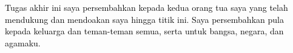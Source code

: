 \vspace{7cm}

\begin{center}
	\textcolor{black}
	{Tugas akhir ini saya persembahkan kepada kedua 
	orang tua saya yang telah mendukung dan mendoakan 
	saya hingga titik ini. Saya persembahkan pula kepada 
	keluarga dan teman-teman semua, serta untuk bangsa, negara, dan agamaku.}
		
\end{center}

